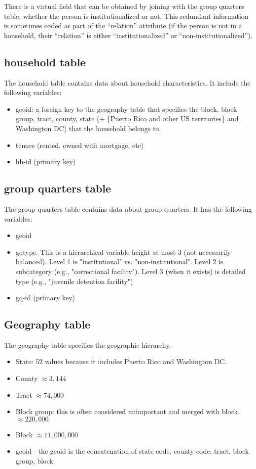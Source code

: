 \documentclass{amsart}
\begin{document}
There is a virtual field that can be obtained by joining with the group quarters table: whether the person is institutionalized or not. This redundant information is sometimes coded as part of the ``relation'' attribute (if the person is not in a household, their ``relation'' is either ``institutionalized'' or ``non-institutionalized'').
\subsection{household table}
The household table contains data about household characteristics. It include the following variables:
\begin{itemize}
\item geoid: a foreign key to the geography table that specifies the block, block group, tract, county, state (+ \{Puerto Rico and other US territories\} and Washington DC) that the household belongs to.
\item tenure (rented, owned with mortgage, etc)
\item hh-id (primary key)
\end{itemize}
\subsection{group quarters table}
The group quarters table contains data about group quarters. It has the following variables:
\begin{itemize}
\item geoid
\item gqtype. This is a hierarchical variable height at most 3 (not necessarily balanced). Level 1 is "institutional" vs. "non-institutional". Level 2 is subcategory (e.g., "correctional facility"). Level 3 (when it exists) is detailed type (e.g., "juvenile detention facility")
\item gq-id (primary key)
\end{itemize}
\subsection{Geography table}
The geography table specifies the geographic hierarchy. 
\begin{itemize}
\item State: 52 values because it includes Puerto Rico and Washington DC.
\item County $\approx 3,144$
\item Tract $\approx 74,000$
\item Block group: this is often considered unimportant and merged with block. $\approx 220,000$
\item Block $\approx 11,000,000$
\item geoid - the geoid is the concatenation of state code, county code, tract, block group, block
\end{itemize}
\end{document}
